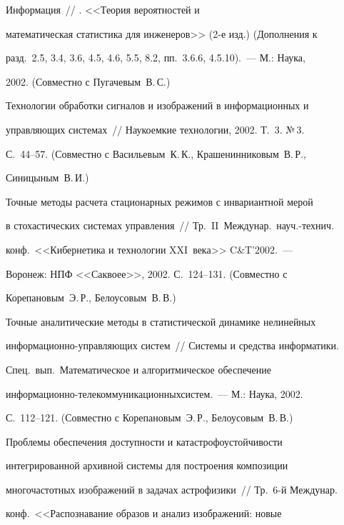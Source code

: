 Информация~// . <<Теория вероятностей и


математическая статистика для инженеров>> (2-е изд.) (Дополнения к


разд.~2.5, 3.4, 3.6, 4.5, 4.6, 5.5, 8.2, пп.~3.6.6, 4.5.10).~--- М.: Наука,


2002. (Совместно с Пугачевым~В.\,С.)





 Технологии обработки сигналов и изображений в информационных и


управляющих системах~// Наукоемкие технологии, 2002. Т.~3. №\,3.


 С.~44--57. (Совместно с Васильевым~К.\,К., Крашенинниковым~В.\,Р.,


Синицыным~В.\,И.)





 Точные методы расчета стационарных режимов с инвариантной мерой


в стохастических системах управления~// Тр.\ II~Междунар.\ науч.-технич.\


конф.\ <<Кибернетика и технологии XXI~ве\-ка>> C\&T'2002.~---


Воронеж: НПФ <<Саквоее>>, 2002. С.~124--131. (Совместно с


Корепановым~Э.\,Р., Белоусовым~В.\,В.)





 Точные аналитические методы в статистической динамике нелинейных


информационно-управляющих систем~// Системы и средства информатики.


Спец.\ вып.\ Математическое и алгоритмическое обеспечение


информационно-телекоммуникационных\linebreak систем.~--- М.: Наука, 2002.


 С.~112--121. (Совместно с Корепановым~Э.\,Р., Белоусовым~В.\,В.)





 Проблемы обеспечения доступности и катастрофо\-устой\-чи\-вости


интегрированной архивной системы для построения композиции


многочастотных изображений в задачах астрофизики~// Тр.\ 6-й Междунар.\


конф.\ <<Распознавание образов и анализ изоб\-ра\-же\-ний: новые


